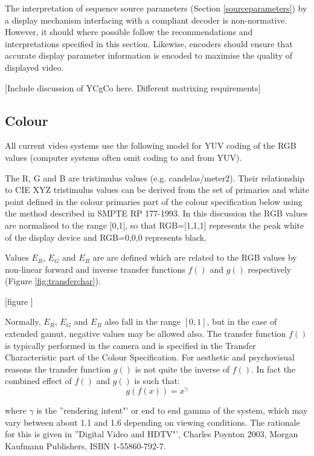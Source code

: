 \label{vidsys}

The interpretation of sequence source parameters (Section \ref{sourceparameters})
by a display mechanism interfacing with a compliant decoder is non-normative. However, it
should where possible follow the recommendations and interpretations
specified in this section. Likewise, encoders should ensure that
accurate display parameter information is encoded to maximise the
quality of displayed video.

[Include discussion of YCgCo here. Different matrixing requirements]

\begin{informative*}
\subsection{Colour}
All current video systems use the following model for YUV coding of the
RGB values (computer systems often omit coding to and from YUV). 

The R, G and B are tristimulus values (e.g. candelas/meter2). Their
relationship to CIE XYZ tristimulus values can be derived from the set
of primaries and white point defined in the colour primaries part of the
colour specification below using the method described in SMPTE RP
177-1993. In this discussion the RGB values are normalised to the range
[0,1], so that RGB=[1,1,1] represents the peak white of the display device
and RGB=0,0,0 represents black.

Values $E_R$, $E_G$ and $E_B$ are are defined which are related to the RGB 
values by non-linear forward and inverse transfer functions $f()$ and $g()$ respectively
(Figure \ref{fig:transferchar}).

[figure \label{fig:transferchar}]

Normally, $E_R$, $E_G$ and $E_B$ also fall in the range $[0,1]$, but in the
case of extended gamut, negative values may be allowed also. The
transfer function $f()$ is typically performed in the camera and
is specified in the Transfer Characteristic part of the
Colour Specification. For aesthetic and psychovisual reasons
the transfer function $g()$ is not quite the inverse of
$f()$. In fact the combined effect of $f()$ and
$g()$ is such that:
\[g(f(x))=x^\gamma\]

where $\gamma$ is the ''rendering intent"' or end to end gamma of the
system, which may vary between about 1.1 and 1.6 depending on viewing
conditions. The rationale for this is given in ''Digital Video and HDTV"',
Charles Poynton 2003, Morgan Kaufmann Publishers, ISBN 1-55860-792-7.


\end{informative*}
